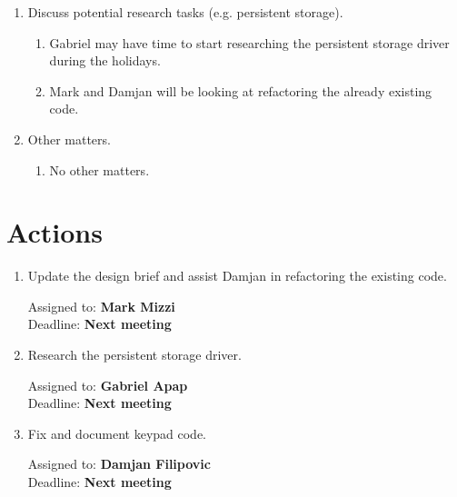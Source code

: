 \documentclass[11pt,a4paper]{scrartcl}
\begin{document}
\begin{enumerate}
   \item Discuss potential research tasks (e.g. persistent storage).
      \begin{enumerate}
         \item Gabriel may have time to start researching the persistent storage driver during the holidays.
         \item Mark and Damjan will be looking at refactoring the already existing code.
      \end{enumerate}
   
   \item Other matters.
      \begin{enumerate}
         \item No other matters.
      \end{enumerate}

\end{enumerate}

\section*{Actions}

\begin{enumerate}

\item Update the design brief and assist Damjan in refactoring the existing code.
\begin{flushright}
Assigned to: \textbf{Mark Mizzi} \\
Deadline: \textbf{Next meeting}
\end{flushright}

\item Research the persistent storage driver.
\begin{flushright}
Assigned to: \textbf{Gabriel Apap} \\
Deadline: \textbf{Next meeting}
\end{flushright}

\item Fix and document keypad code.
\begin{flushright}
Assigned to: \textbf{Damjan Filipovic} \\
Deadline: \textbf{Next meeting}
\end{flushright}


\end{enumerate}
\end{document}
